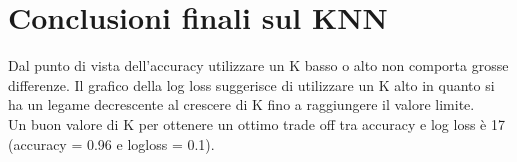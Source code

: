 \section{Conclusioni finali sul KNN}
Dal punto di vista dell'accuracy utilizzare un K basso o alto non comporta grosse differenze. Il grafico della log loss suggerisce di utilizzare un K alto in quanto si ha un legame decrescente al crescere di K fino a raggiungere il valore limite.\\
Un buon valore di K per ottenere un ottimo trade off tra accuracy e log loss è 17 (accuracy = 0.96 e logloss = 0.1).
